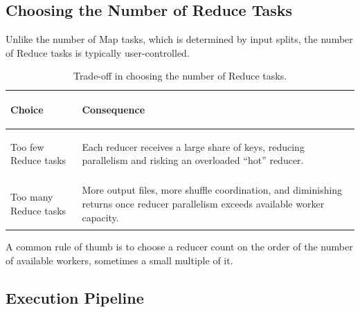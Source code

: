 \documentclass[11pt,a4paper,oneside]{book}
\begin{document}
\subsection{Choosing the Number of Reduce Tasks}

Unlike the number of Map tasks, which is determined by input splits, the number of Reduce tasks is typically user-controlled.

\begin{table}[htbp]
\centering
\caption{Trade-off in choosing the number of Reduce tasks.}
\label{tab:reducers-tradeoff}
\begin{tabularx}{\textwidth}{>{\bfseries\raggedright\arraybackslash}p{3.1cm} Y}
\toprule
{}
Choice & Consequence \\
\midrule
Too few Reduce tasks & Each reducer receives a large share of keys, reducing parallelism and risking an overloaded ``hot'' reducer. \\
Too many Reduce tasks & More output files, more shuffle coordination, and diminishing returns once reducer parallelism exceeds available worker capacity. \\
\bottomrule
\end{tabularx}
\end{table}

A common rule of thumb is to choose a reducer count on the order of the number of available workers, sometimes a small multiple of it.

\subsection{Execution Pipeline}
\end{document}
